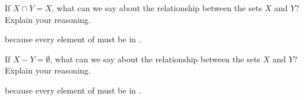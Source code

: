\documentclass[nooutcomes]{ximera}
\begin{document}
\begin{problem}
If $X\cap Y = X$, what can we say about the relationship between the sets $X$ and $Y$? Explain your reasoning.

because every element of  must be in .
\end{problem}

\begin{problem}
If $X-Y =\emptyset$, what can we say about the relationship between the sets $X$ and $Y$? Explain your reasoning.

because every element of  must be in .
\end{problem}
\end{document}
